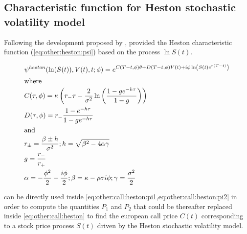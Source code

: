 \documentclass[12pt]{report}
\begin{document}
\subsection{Characteristic function for Heston stochastic volatility model}
\label{sub:other:option:heston}

Following the development proposed by \citet{gatheral2006}, \citet{criso2015} provided the Heston characteristic function (\cref{eq:other:heston:psi}) based on the process $\ln S(t)$.

\begin{align}
  &\psi^{heston}(\ln(S(t)),V(t),t;\phi) = e^{C(T-t, \phi)\theta + D(T-t, \phi)V(t) + i\phi\ln\left(S(t)e^{r(T-t)}\right)} \label{eq:other:heston:psi} \\
  \intertext{where}
  &C(\tau, \phi) = \kappa \left(r_{-} \tau - \frac{2}{\sigma^2}\ln\left(\frac{1 - g e^{-h\tau}}{1 - g}\right)\right) \notag \\
  &D(\tau, \phi) = r_{-}\frac{1 - e^{-h\tau}}{1 - ge^{-h\tau}} \notag \\ 
  \intertext{and}
  &r_{\pm} = \frac{\beta \pm h}{\sigma^2}; h = \sqrt{\beta^2 - 4\alpha\gamma} \notag \\
  &g = \frac{r_{-}}{r_{+}} \notag \\
  &\alpha = -\frac{\phi^2}{2} - \frac{i\phi}{2}; \beta = \kappa - \rho\sigma i\phi; \gamma = \frac{\sigma^2}{2} \notag
\end{align}

 can be directly used inside \cref{eq:other:call:heston:pi1,eq:other:call:heston:pi2} in order to compute the quantities $P_1$ and $P_2$ that could be thereafter replaced inside \cref{eq:other:call:heston} to find the european call price  $C(t)$ corresponding to a stock price process $S(t)$ driven by the Heston stochastic volatility model.
\end{document}
